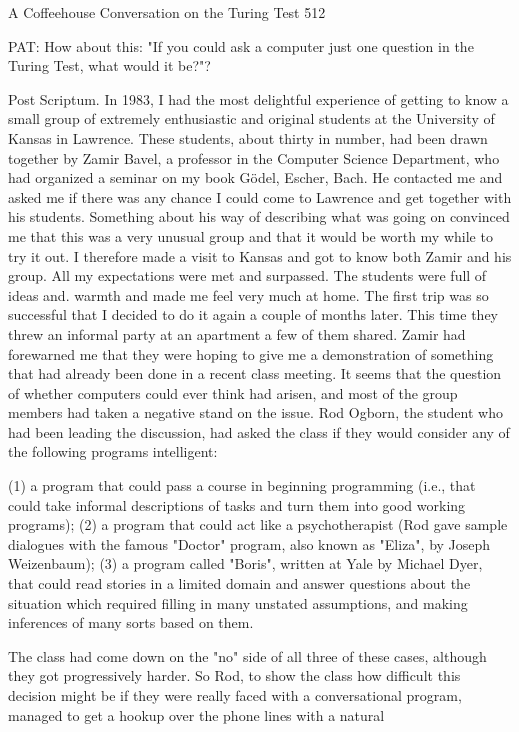A Coffeehouse Conversation on the Turing Test                                       512

PAT: How about this: "If you could ask a computer just one question in the Turing
   Test, what would it be?"?


Post Scriptum.
     In 1983, I had the most delightful experience of getting to know a small group of
extremely enthusiastic and original students at the University of Kansas in Lawrence.
These students, about thirty in number, had been drawn together by Zamir Bavel, a
professor in the Computer Science Department, who had organized a seminar on my
book Gödel, Escher, Bach. He contacted me and asked me if there was any chance I
could come to Lawrence and get together with his students. Something about his way
of describing what was going on convinced me that this was a very unusual group and
that it would be worth my while to try it out. I therefore made a visit to Kansas and
got to know both Zamir and his group. All my expectations were met and surpassed.
The students were full of ideas and. warmth and made me feel very much at home.
The first trip was so successful that I decided to do it again a couple of months later.
This time they threw an informal party at an apartment a few of them shared. Zamir
had forewarned me that they were hoping to give me a demonstration of something
that had already been done in a recent class meeting. It seems that the question of
whether computers could ever think had arisen, and most of the group members had
taken a negative stand on the issue. Rod Ogborn, the student who had been leading
the discussion, had asked the class if they would consider any of the following
programs intelligent:

  (1) a program that could pass a course in beginning programming (i.e., that
     could take informal descriptions of tasks and turn them into good working
     programs);
  (2) a program that could act like a psychotherapist (Rod gave sample dialogues
     with the famous "Doctor" program, also known as "Eliza", by Joseph
     Weizenbaum);
  (3) a program called "Boris", written at Yale by Michael Dyer, that could read
     stories in a limited domain and answer questions about the situation which
     required filling in many unstated assumptions, and making inferences of
     many sorts based on them.

       The class had come down on the "no" side of all three of these cases, although
they got progressively harder. So Rod, to show the class how difficult this decision
might be if they were really faced with a conversational program, managed to get a
hookup over the phone lines with a natural




